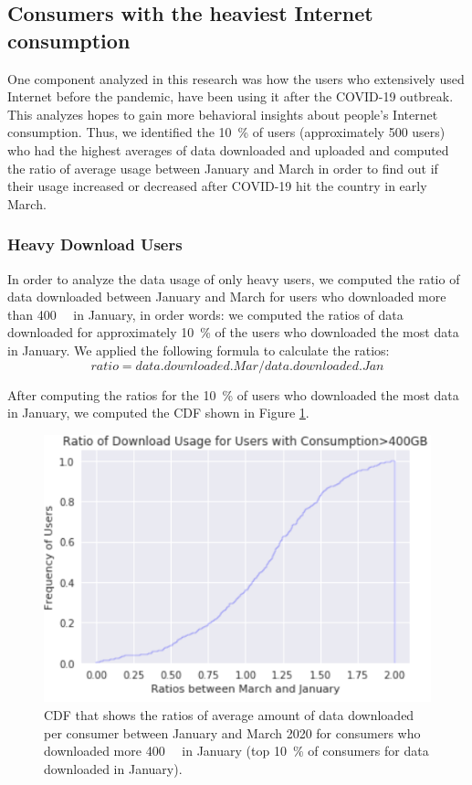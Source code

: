 \documentclass[conference,10pt]{IEEEtran}
\begin{document}
\subsection{Consumers with the heaviest Internet consumption}
\label{sec:analyzing-the-users-with-the-highest-internet-usage}

One component analyzed in this research was how the users who extensively used Internet before the pandemic, have been using it after the COVID-19 outbreak. This analyzes hopes to gain more behavioral insights about people's Internet consumption. Thus, we identified the \SI{10}{\percent} of users (approximately 500 users) who had the highest averages of data downloaded and uploaded and computed the ratio of average usage between January and March in order to find out if their usage increased or decreased after COVID-19 hit the country in early March.

\subsubsection{Heavy Download Users}
\label{sec:heavy-download-users}

In order to analyze the data usage of only heavy users, we computed the ratio of data downloaded between January and March for users who downloaded more than \SI{400}{\giga\byte} in January, in order words: we computed the ratios of data downloaded for approximately \SI{10}{\percent} of the users who downloaded the most data in January. We applied the following formula to calculate the ratios:
\begin{equation}
ratio= data.downloaded.Mar/ data.downloaded.Jan
\end{equation}

After computing the ratios for the \SI{10}{\percent} of users who downloaded the most data in January, we computed the CDF shown in Figure \ref{fig:heavydown}.

\begin{figure}
\centering
\includegraphics[width=1.0\linewidth]{figs/heavydown.PNG}
\caption{CDF that shows the ratios of average amount of data downloaded per consumer between January and March 2020 for consumers who downloaded more \SI{400}{\giga\byte} in January (top \SI{10}{\percent} of consumers for data downloaded in January).}
\label{fig:heavydown}
\end{figure}
\end{document}
